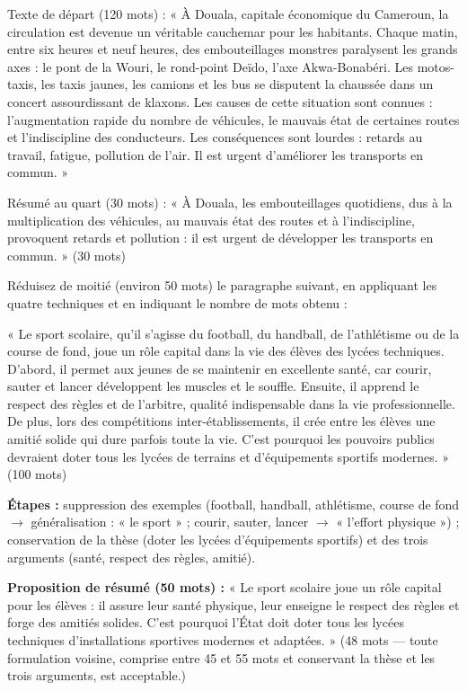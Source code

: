 \documentclass[11pt]{article}
\begin{document}
\begin{exemplebox}
Texte de départ (120 mots) : « À Douala, capitale économique du Cameroun, la circulation est devenue un véritable cauchemar pour les habitants. Chaque matin, entre six heures et neuf heures, des embouteillages monstres paralysent les grands axes : le pont de la Wouri, le rond-point Deïdo, l'axe Akwa-Bonabéri. Les motos-taxis, les taxis jaunes, les camions et les bus se disputent la chaussée dans un concert assourdissant de klaxons. Les causes de cette situation sont connues : l'augmentation rapide du nombre de véhicules, le mauvais état de certaines routes et l'indiscipline des conducteurs. Les conséquences sont lourdes : retards au travail, fatigue, pollution de l'air. Il est urgent d'améliorer les transports en commun. »

Résumé au quart (30 mots) : « À Douala, les embouteillages quotidiens, dus à la multiplication des véhicules, au mauvais état des routes et à l'indiscipline, provoquent retards et pollution : il est urgent de développer les transports en commun. » (30 mots)
\end{exemplebox}

\begin{exercice}
Réduisez de moitié (environ 50 mots) le paragraphe suivant, en appliquant les quatre techniques et en indiquant le nombre de mots obtenu :

« Le sport scolaire, qu'il s'agisse du football, du handball, de l'athlétisme ou de la course de fond, joue un rôle capital dans la vie des élèves des lycées techniques. D'abord, il permet aux jeunes de se maintenir en excellente santé, car courir, sauter et lancer développent les muscles et le souffle. Ensuite, il apprend le respect des règles et de l'arbitre, qualité indispensable dans la vie professionnelle. De plus, lors des compétitions inter-établissements, il crée entre les élèves une amitié solide qui dure parfois toute la vie. C'est pourquoi les pouvoirs publics devraient doter tous les lycées de terrains et d'équipements sportifs modernes. » (100 mots)
\end{exercice}

\begin{corrige}
\textbf{Étapes :} suppression des exemples (football, handball, athlétisme, course de fond $\rightarrow$ généralisation : « le sport » ; courir, sauter, lancer $\rightarrow$ « l'effort physique ») ; conservation de la thèse (doter les lycées d'équipements sportifs) et des trois arguments (santé, respect des règles, amitié).

\textbf{Proposition de résumé (50 mots) :} « Le sport scolaire joue un rôle capital pour les élèves : il assure leur santé physique, leur enseigne le respect des règles et forge des amitiés solides. C'est pourquoi l'État doit doter tous les lycées techniques d'installations sportives modernes et adaptées. » (48 mots — toute formulation voisine, comprise entre 45 et 55 mots et conservant la thèse et les trois arguments, est acceptable.)
\end{corrige}
\end{document}
